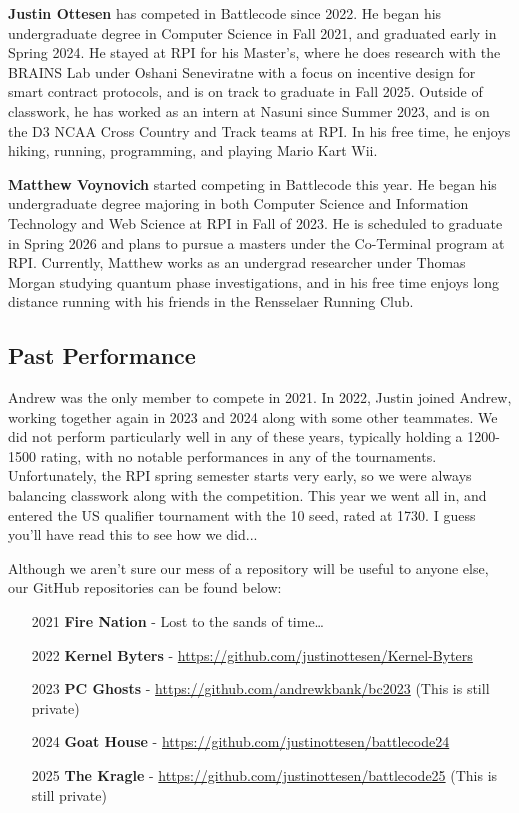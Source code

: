 \documentclass{article}
\begin{document}
  \medskip

  \textbf{Justin Ottesen} has competed in Battlecode since 2022. He began his undergraduate degree in Computer Science in Fall 2021, and graduated early in Spring 2024. He stayed at RPI for his Master's, where he does research with the BRAINS Lab under Oshani Seneviratne with a focus on incentive design for smart contract protocols, and is on track to graduate in Fall 2025. Outside of classwork, he has worked as an intern at Nasuni since Summer 2023, and is on the D3 NCAA Cross Country and Track teams at RPI. In his free time, he enjoys hiking, running, programming, and playing Mario Kart Wii.

  \medskip

  \textbf{Matthew Voynovich} started competing in Battlecode this year. He began his undergraduate degree majoring in both Computer Science and Information Technology and Web Science at RPI in Fall of 2023. He is scheduled to graduate in Spring 2026 and plans to pursue a masters under the Co-Terminal program at RPI. Currently, Matthew works as an undergrad researcher under Thomas Morgan studying quantum phase investigations, and in his free time enjoys long distance running with his friends in the Rensselaer Running Club.

  \newpage
  \subsection{Past Performance}

  Andrew was the only member to compete in 2021. In 2022, Justin joined Andrew, working together again in 2023 and 2024 along with some other teammates. We did not perform particularly well in any of these years, typically holding a 1200-1500 rating, with no notable performances in any of the tournaments. Unfortunately, the RPI spring semester starts very early, so we were always balancing classwork along with the competition. This year we went all in, and entered the US qualifier tournament with the 10 seed, rated at 1730. I guess you'll have read this to see how we did...

  \medskip

  Although we aren't sure our mess of a repository will be useful to anyone else, our GitHub repositories can be found below:
  \begin{enumerate}
    \item[2021] \textbf{Fire Nation} - Lost to the sands of time\dots
    \item[2022] \textbf{Kernel Byters} - \url{https://github.com/justinottesen/Kernel-Byters}
    \item[2023] \textbf{PC Ghosts} - \url{https://github.com/andrewkbank/bc2023} (This is still private)
    \item[2024] \textbf{Goat House} - \url{https://github.com/justinottesen/battlecode24}
    \item[2025] \textbf{The Kragle} - \url{https://github.com/justinottesen/battlecode25} (This is still private)
  \end{enumerate}
\end{document}
